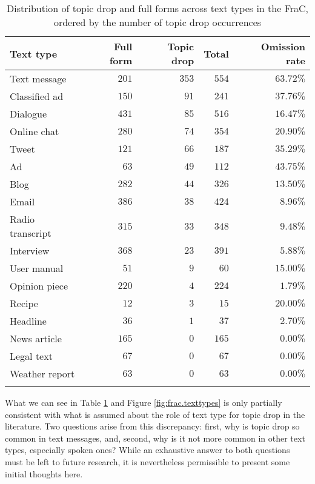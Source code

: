 \begin{table}
\centering
\caption[Distribution of topic drop and full forms per text type in the FraC]{Distribution of topic drop and full forms across text types in the FraC, ordered by the number of topic drop occurrences}
\begin{tabular}{lrrrr}
\lsptoprule
Text type & Full form & Topic drop & Total & Omission rate\\
\midrule
Text message & $201$ & $353$ & $554$ & $63.72\%$\\
Classified ad & $150$ & $91$ & $241$ & $37.76\%$\\
Dialogue & $431$ & $85$ & $516$ & $16.47\%$\\
Online chat & $280$ & $74$ & $354$ & $20.90\%$\\
Tweet & $121$ & $66$ & $187$ & $35.29\%$ \\
Ad & $63$ & $49$ & $112$ & $43.75\%$ \\
Blog & $282$ & $44$ & $326$ & $13.50\%$\\
Email & $386$ & $38$ & $424$ & $8.96\%$\\
Radio transcript & $315$ & $33$ & $348$ & $9.48\%$\\
Interview & $368$ & $23$ & $391$ & $5.88\%$\\
User manual & $51$ & $9$ & $60$ & $15.00\%$\\
Opinion piece & $220$ & $4$ & $224$ & $1.79\%$\\
Recipe & $12$ & $3$ & $15$ & $20.00\%$\\
Headline & $36$ & $1$ & $37$ & $2.70\%$\\
News article & $165$ & $0$ & $165$ & $0.00\%$\\ 
Legal text & $67$ & $0$ & $67$ & $0.00\%$\\
Weather report & $63$ & $0$ & $63$ & $0.00\%$\\
\lspbottomrule
\end{tabular}
\label{tab:fraC.texttypes}
\end{table}

What we can see in Table \ref{tab:fraC.texttypes} and Figure \ref{fig:frac.texttypes} is only partially consistent with what is assumed about the role of text type for topic drop in the literature.
Two questions arise from this discrepancy:
first, why is topic drop so common in text messages, and, second, why is it not more common in other text types, especially spoken ones?
While an exhaustive answer to both questions must be left to future research, it is nevertheless permissible to present some initial thoughts here.

